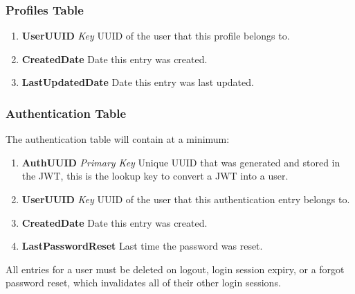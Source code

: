         \subsubsection{Profiles Table}
            \begin{enumerate}[leftmargin=3\parindent]
                \item \textbf{UserUUID} \textit{Key} UUID of the user that this profile belongs to.
                \item \textbf{CreatedDate} Date this entry was created.
                \item \textbf{LastUpdatedDate} Date this entry was last updated.
            \end{enumerate}

        \subsubsection{Authentication Table}
        The authentication table will contain at a minimum:
            \begin{enumerate}[leftmargin=3\parindent]
                \item \textbf{AuthUUID} \textit{Primary Key} Unique UUID that was generated and stored in the JWT, this is the lookup key to convert a JWT into a user.
                \item \textbf{UserUUID} \textit{Key} UUID of the user that this authentication entry belongs to.
                \item \textbf{CreatedDate} Date this entry was created.
                \item \textbf{LastPasswordReset} Last time the password was reset.
            \end{enumerate}
            All entries for a user must be deleted on logout, login session expiry, or a forgot password reset, which invalidates all of their other login sessions.

